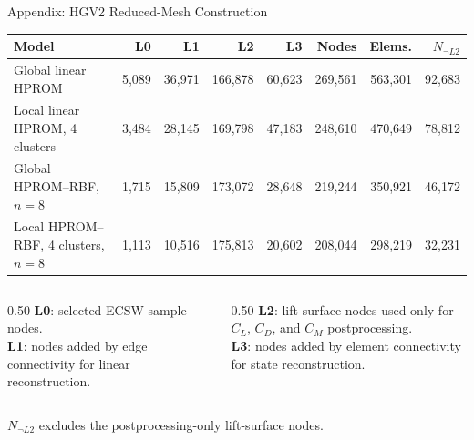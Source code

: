 \documentclass[aspectratio=169]{beamer}
\begin{document}
\begin{frame}{Appendix: HGV2 Reduced-Mesh Construction}
\centering
\scriptsize
\renewcommand{\arraystretch}{1.17}
\setlength{\tabcolsep}{2pt}
\begin{tabular}{lrrrrrrr}
\toprule
Model & L0 & L1 & L2 & L3 & Nodes & Elems. & $N_{\neg L2}$ \\
\midrule
Global linear HPROM & 5,089 & 36,971 & 166,878 & 60,623 & 269,561 & 563,301 & 92,683 \\
Local linear HPROM, 4 clusters & 3,484 & 28,145 & 169,798 & 47,183 & 248,610 & 470,649 & 78,812 \\
Global HPROM--RBF, $n=8$ & 1,715 & 15,809 & 173,072 & 28,648 & 219,244 & 350,921 & 46,172 \\
Local HPROM--RBF, 4 clusters, $n=8$ & 1,113 & 10,516 & 175,813 & 20,602 & 208,044 & 298,219 & 32,231 \\
\bottomrule
\end{tabular}

\vspace{0.32cm}
\begin{columns}[T,onlytextwidth]
\begin{column}{0.50\textwidth}
\textbf{L0}: selected ECSW sample nodes.\\
\textbf{L1}: nodes added by edge connectivity for linear reconstruction.
\end{column}
\begin{column}{0.50\textwidth}
\textbf{L2}: lift-surface nodes used only for $C_L$, $C_D$, and $C_M$ postprocessing.\\
\textbf{L3}: nodes added by element connectivity for state reconstruction.
\end{column}
\end{columns}

\vspace{0.18cm}
\footnotesize $N_{\neg L2}$ excludes the postprocessing-only lift-surface nodes.
\end{frame}
\end{document}
